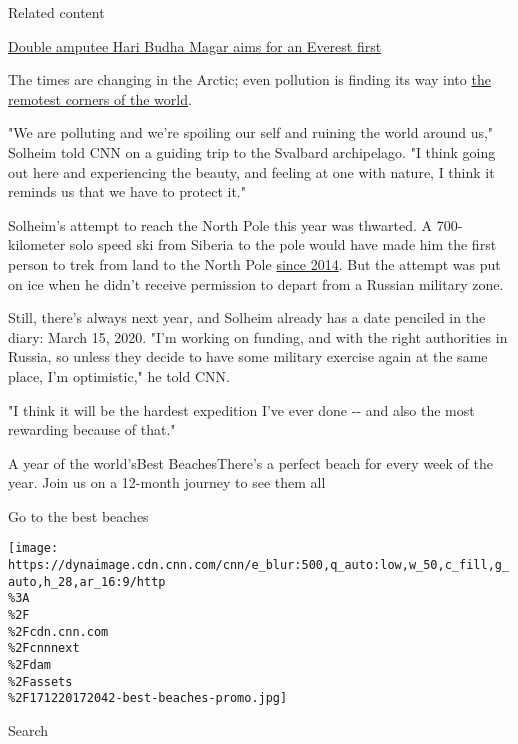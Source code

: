 Related content

\href{/travel/article/hari-budha-magar-double-amputee-everest/index.html}{Double
amputee Hari Budha Magar aims for an Everest first}

The times are changing in the Arctic; even pollution is finding its way
into
\href{https://edition.cnn.com/2019/08/15/world/microplastics-arctic-snow-alps-study-scr-trnd/index.html}{the
remotest corners of the world}.

"We are polluting and we're spoiling our self and ruining the world
around us," Solheim told CNN on a guiding trip to the Svalbard
archipelago. "I think going out here and experiencing the beauty, and
feeling at one with nature, I think it reminds us that we have to
protect it."

Solheim's attempt to reach the North Pole this year was thwarted. A
700-kilometer solo speed ski from Siberia to the pole would have made
him the first person to trek from land to the North Pole
\href{https://docs.google.com/spreadsheets/d/1AxP_1zx2JJWlcrEOZyAcAq0ohWHr_4Lg2uMpVD6DeWw/edit\#gid=0}{since
2014}. But the attempt was put on ice when he didn't receive permission
to depart from a Russian military zone.

Still, there's always next year, and Solheim already has a date penciled
in the diary: March 15, 2020. "I'm working on funding, and with the
right authorities in Russia, so unless they decide to have some military
exercise again at the same place, I'm optimistic," he told CNN.

"I think it will be the hardest expedition I've ever done -\/- and also
the most rewarding because of that."

\href{//www.cnn.com/interactive/travel/best-beaches}{}

A year of the world'sBest BeachesThere's a perfect beach for every week
of the year. Join us on a 12-month journey to see them all

Go to the best beaches

\texttt{[image: https://dynaimage.cdn.cnn.com/cnn/e\_blur:500,q\_auto:low,w\_50,c\_fill,g\_auto,h\_28,ar\_16:9/http\\\%3A\\\%2F\\\%2Fcdn.cnn.com\\\%2Fcnnnext\\\%2Fdam\\\%2Fassets\\\%2F171220172042-best-beaches-promo.jpg]}

Search

